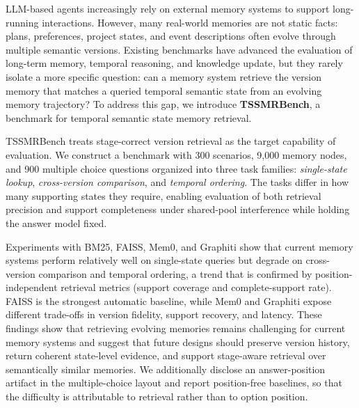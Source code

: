 LLM-based agents increasingly rely on external memory systems to support long-running interactions. However, many real-world memories are not static facts: plans, preferences, project states, and event descriptions often evolve through multiple semantic versions. Existing benchmarks have advanced the evaluation of long-term memory, temporal reasoning, and knowledge update, but they rarely isolate a more specific question: can a memory system retrieve the version memory that matches a queried temporal semantic state from an evolving memory trajectory? To address this gap, we introduce \textbf{TSSMRBench}, a benchmark for temporal semantic state memory retrieval.

TSSMRBench treats stage-correct version retrieval as the target capability of evaluation. We construct a benchmark with 300 scenarios, 9{,}000 memory nodes, and 900 multiple choice questions organized into three task families: \emph{single-state lookup}, \emph{cross-version comparison}, and \emph{temporal ordering}. The tasks differ in how many supporting states they require, enabling evaluation of both retrieval precision and support completeness under shared-pool interference while holding the answer model fixed.

Experiments with BM25, FAISS, Mem0, and Graphiti show that current memory systems perform relatively well on single-state queries but degrade on cross-version comparison and temporal ordering, a trend that is confirmed by position-independent retrieval metrics (support coverage and complete-support rate). FAISS is the strongest automatic baseline, while Mem0 and Graphiti expose different trade-offs in version fidelity, support recovery, and latency. These findings show that retrieving evolving memories remains challenging for current memory systems and suggest that future designs should preserve version history, return coherent state-level evidence, and support stage-aware retrieval over semantically similar memories. We additionally disclose an answer-position artifact in the multiple-choice layout and report position-free baselines, so that the difficulty is attributable to retrieval rather than to option position.
